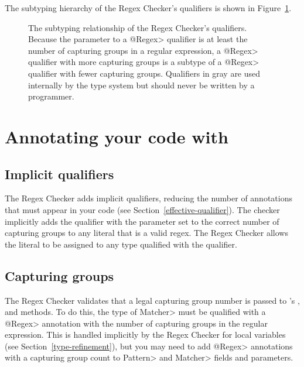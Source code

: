 The subtyping hierarchy of the Regex Checker's qualifiers is shown in
Figure~\ref{fig-regex-hierarchy}.

\begin{figure}
\caption{The subtyping relationship of the Regex Checker's qualifiers.
  Because the parameter to a \<@Regex> qualifier is at least the number of
  capturing groups in a regular expression, a \<@Regex> qualifier with more
  capturing groups is a subtype of a \<@Regex> qualifier with fewer capturing
  groups. Qualifiers in gray are used internally by the type
  system but should never be written by a programmer.}
\label{fig-regex-hierarchy}
\end{figure}

\section{Annotating your code with \label{annotating-with-regex}}


\subsection{Implicit qualifiers\label{regex-implicit-qualifiers}}

The Regex Checker adds
implicit qualifiers, reducing the number of annotations that must appear
in your code (see Section~\ref{effective-qualifier}).
The checker implicitly adds the  qualifier with
the parameter set to the correct number of capturing groups to
any  literal that is a valid regex. The Regex Checker allows
the  literal to be assigned to any type qualified with the
 qualifier.


\subsection{Capturing groups\label{regex-capturing-groups}}

The Regex Checker validates that a legal capturing group number is passed
to 's
,
 and
 methods. To do this,
the type of \<Matcher> must be qualified with a \<@Regex> annotation
with the number of capturing groups in the regular expression. This is
handled implicitly by the Regex Checker for local variables (see
Section~\ref{type-refinement}), but you may need to add \<@Regex> annotations
with a capturing group count to \<Pattern> and \<Matcher> fields and
parameters.


